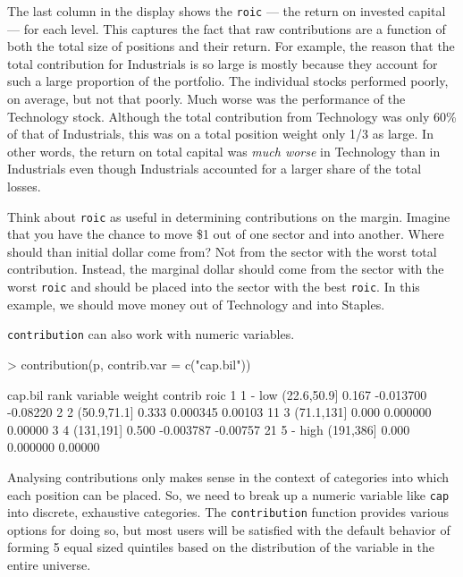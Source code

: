 \documentclass[a4paper]{report}
\begin{document}
\begin{article}
The last column in the display shows the \texttt{roic} --- the return
on invested capital --- for each level. This captures the fact that
raw contributions are a function of both the total size of positions
and their return. For example, the reason that the total contribution
for Industrials is so large is mostly because they account for such a
large proportion of the portfolio. The individual stocks performed
poorly, on average, but not that poorly. Much worse was the
performance of the Technology stock. Although the total contribution
from Technology was only 60\% of that of Industrials, this was on a
total position weight only 1/3 as large. In other words, the return on
total capital was \emph{much worse} in Technology than in Industrials
even though Industrials accounted for a larger share of the total
losses.

Think about \texttt{roic} as useful in determining contributions on
the margin. Imagine that you have the chance to move \$1 out of one
sector and into another. Where should than initial dollar come from?
Not from the sector with the worst total contribution. Instead, the
marginal dollar should come from the sector with the worst
\texttt{roic} and should be placed into the sector with the best
\texttt{roic}. In this example, we should move money out of Technology
and into Staples.

\texttt{contribution} can also work with numeric variables.

\begin{Schunk}
\begin{Sinput}
> contribution(p, contrib.var = c("cap.bil"))
\end{Sinput}
\begin{Soutput}
cap.bil 
       rank    variable weight   contrib     roic
1   1 - low (22.6,50.9]  0.167 -0.013700 -0.08220
2         2 (50.9,71.1]  0.333  0.000345  0.00103
11        3  (71.1,131]  0.000  0.000000  0.00000
3         4   (131,191]  0.500 -0.003787 -0.00757
21 5 - high   (191,386]  0.000  0.000000  0.00000
\end{Soutput}
\end{Schunk}

Analysing contributions only makes sense in the context of categories
into which each position can be placed. So, we need to break up a
numeric variable like \texttt{cap} into discrete, exhaustive
categories. The \texttt{contribution} function provides various
options for doing so, but most users will be satisfied with the
default behavior of forming 5 equal sized quintiles based on the
distribution of the variable in the entire universe.


\end{article}
\end{document}
